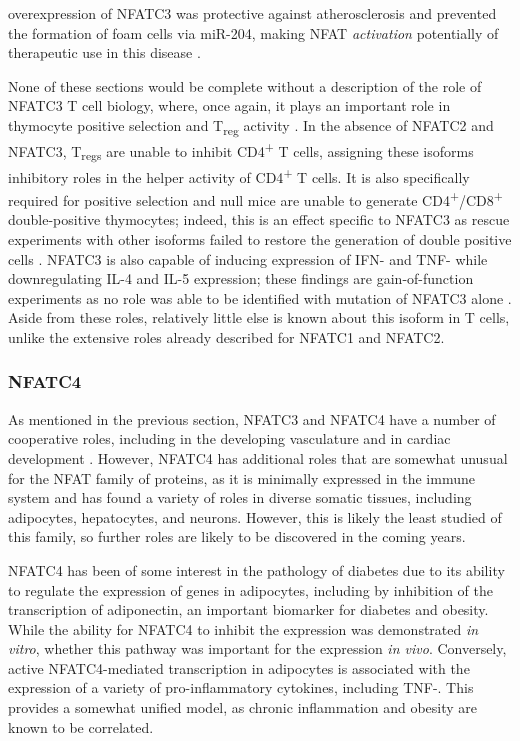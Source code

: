 overexpression of NFATC3 was protective against atherosclerosis and prevented the formation of foam cells via miR-204, making NFAT \textit{activation} potentially of therapeutic use in this disease \citep{Liu2021}. 

None of these sections would be complete without a description of the role of NFATC3 T cell biology, where, once again, it plays an important role in thymocyte positive selection and T\textsubscript{reg} activity \citep{Ho1995, Bopp2005}. In the absence of NFATC2 and NFATC3, T\textsubscript{regs} are unable to inhibit CD4\textsuperscript{+} T cells, assigning these isoforms inhibitory roles in the helper activity of CD4\textsuperscript{+} T cells. It is also specifically required for positive selection and null mice are unable to generate CD4\textsuperscript{+}/CD8\textsuperscript{+} double-positive thymocytes; indeed, this is an effect specific to NFATC3 as rescue experiments with other isoforms failed to restore the generation of double positive cells \citep{CanteBarrett2007}. NFATC3 is also capable of inducing expression of IFN-\textgamma{} and TNF-\textalpha{} while downregulating IL-4 and IL-5 expression; these findings are gain-of-function experiments as no role was able to be identified with mutation of NFATC3 alone \citep{Chen2003}. Aside from these roles, relatively little else is known about this isoform in T cells, unlike the extensive roles already described for NFATC1 and NFATC2.

\subsubsection{NFATC4}\label{nfatc4}

As mentioned in the previous section, NFATC3 and NFATC4 have a number of cooperative roles, including in the developing vasculature and in cardiac development \citep{Graef2001, Bushdid2003}. However, NFATC4 has additional roles that are somewhat unusual for the NFAT family of proteins, as it is minimally expressed in the immune system and has found a variety of roles in diverse somatic tissues, including adipocytes, hepatocytes, and neurons. However, this is likely the least studied of this family, so further roles are likely to be discovered in the coming years.

NFATC4 has been of some interest in the pathology of diabetes due to its ability to regulate the expression of genes in adipocytes, including by inhibition of the transcription of adiponectin, an important biomarker for diabetes and obesity. While the ability for NFATC4 to inhibit the expression was demonstrated \textit{in vitro}, whether this pathway was important for the expression \textit{in vivo}. Conversely, active NFATC4-mediated transcription in adipocytes is associated with the expression of a variety of pro-inflammatory cytokines, including TNF-\textalpha. This provides a somewhat unified model, as chronic inflammation and obesity are known to be correlated. 

